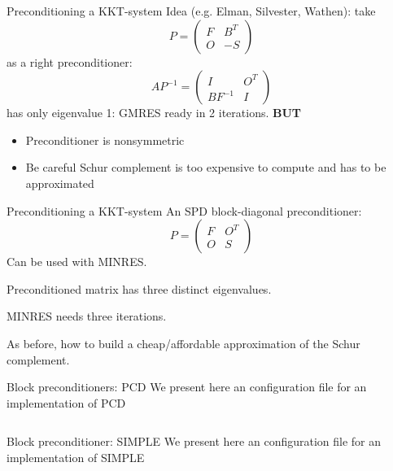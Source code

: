 \begin{frame}{Preconditioning a KKT-system}
  Idea (e.g. Elman, Silvester, Wathen): take
  \begin{equation*}
    P =
    \begin{pmatrix}
F & B^T\\
O &-S
    \end{pmatrix}
  \end{equation*}
  as a right preconditioner:
  \begin{equation*}
    AP^{-1} =
    \begin{pmatrix}
I & O^T\\
BF^{-1} & I
    \end{pmatrix}
  \end{equation*}
  has only eigenvalue 1: GMRES ready in 2 iterations. \textbf{BUT}
  \begin{itemize}
  \item  Preconditioner is nonsymmetric
\item Be careful Schur complement is too expensive to compute and has to
be approximated

  \end{itemize}
\end{frame}

\begin{frame}{Preconditioning a KKT-system}
  An SPD block-diagonal preconditioner:
  \begin{equation*}
    P=
    \begin{pmatrix}
F & O^T\\
O & S
    \end{pmatrix}
  \end{equation*}
  Can be used with \textsc{MINRES}.

  Preconditioned matrix has three
  distinct eigenvalues.

\textsc{MINRES} needs three iterations.

As before, how to build a cheap/affordable approximation
of the Schur complement.
\end{frame}


\begin{frame}{Block preconditioners: PCD}
  We present here an configuration file for an implementation of PCD
  \inputminted{bash}{pcd_lu_lu.cfg}
\end{frame}

\begin{frame}{Block preconditioner: SIMPLE}
  We present here an configuration file for an implementation of SIMPLE
  \inputminted{bash}{simple_lu_lu.cfg}
\end{frame}

